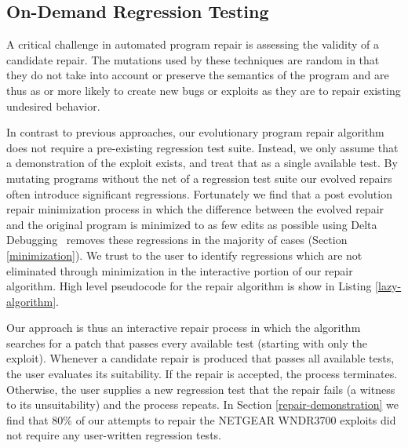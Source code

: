 \documentclass{sigcomm-alternate}
\begin{document}
\subsection{On-Demand Regression Testing}
\label{on-demand-regression}

A critical challenge in automated program repair is assessing the
validity of a candidate repair.  The mutations used by these
techniques are random in that they do not take into account or
preserve the semantics of the program and are thus as or more likely
to create new bugs or exploits as they are to repair existing
undesired behavior.

In contrast to previous approaches, our evolutionary program repair
algorithm does not require a pre-existing regression test suite.
Instead, we only assume that a demonstration of the exploit exists,
and treat that as a single available test.  By mutating programs
without the net of a regression test suite our evolved repairs often
introduce significant regressions.  Fortunately we find that a post
evolution repair minimization process in which the difference between
the evolved repair and the original program is minimized to as few
edits as possible using Delta Debugging~\cite{delta} removes these
regressions in the majority of cases (Section \ref{minimization}).  We
trust to the user to identify regressions which are not eliminated
through minimization in the interactive portion of our repair
algorithm.  High level pseudocode for the repair algorithm is show in
Listing \ref{lazy-algorithm}.

Our approach is thus an interactive repair process in which the
algorithm searches for a patch that 
passes every available test (starting with only the exploit). 
Whenever a candidate repair is produced that passes all available tests,
the user evaluates its suitability. If the repair is accepted, the process
terminates. Otherwise, the user supplies a new regression test that the repair
fails (a witness to its unsuitability) and the process repeats. 
In Section \ref{repair-demonstration} we find that 80\% of our
attempts to repair the NETGEAR WNDR3700 exploits did not require any
user-written regression tests.
\end{document}
